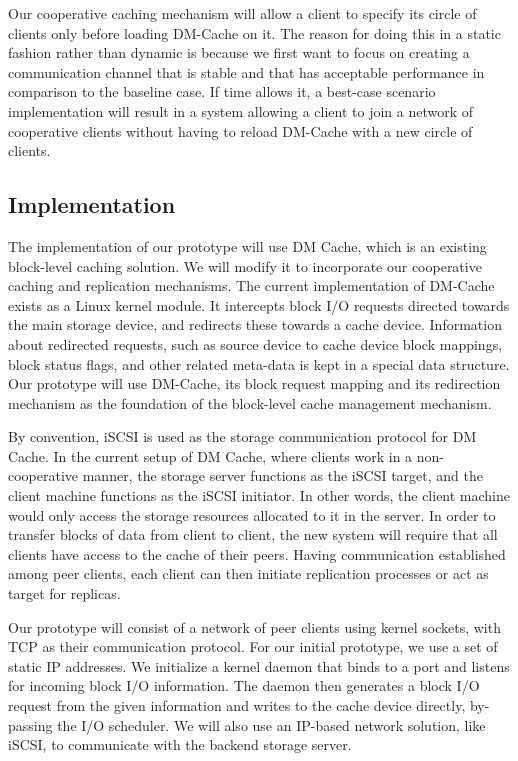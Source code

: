 Our cooperative caching mechanism will allow a client to specify its circle of
clients only before loading DM-Cache on it. The reason for doing this in a
static fashion rather than dynamic is because we first want to focus on creating
a communication channel that is stable and that has acceptable performance in
comparison to the baseline case. If time allows it, a best-case scenario
implementation will result in a system allowing a client to join a network of
cooperative clients without having to reload DM-Cache with a new circle of clients.

\subsection{Implementation}

The implementation of our prototype will use DM Cache,
which is an existing block-level caching solution. We will
modify it to incorporate our cooperative caching and
replication mechanisms. The current implementation of DM-Cache
exists as a Linux kernel module. It intercepts block
I/O requests directed towards the main storage device, and
redirects these towards a cache device. Information
about redirected requests, such as source device to cache device
block mappings, block status flags, and other related meta-data
is kept in a special data structure. Our prototype will use
DM-Cache, its block request mapping and its redirection mechanism
as the foundation of the block-level cache management mechanism.

By convention, iSCSI is used as the storage communication
protocol for DM Cache. In the current setup of DM Cache,
where clients work in a non-cooperative manner, the storage server
functions as the iSCSI target, and the client machine functions as
the iSCSI initiator. In other words, the client machine would only
access the storage resources allocated to it in the server. In
order to transfer blocks of data from client to client, the new
system will require that all clients have access to the
cache of their peers. Having communication established among
peer clients, each client can then initiate replication processes
or act as target for replicas.

Our prototype will consist of a network of peer
clients using kernel sockets, with TCP as their communication
protocol. For our initial prototype, we use a set of static IP
addresses. We initialize a kernel daemon that binds to a port
and listens for incoming block I/O information. The daemon then
generates a block I/O request from the given information and
writes to the cache device directly, by-passing the I/O scheduler.
We will also use an IP-based network solution, like iSCSI, to
communicate with the backend storage server.

